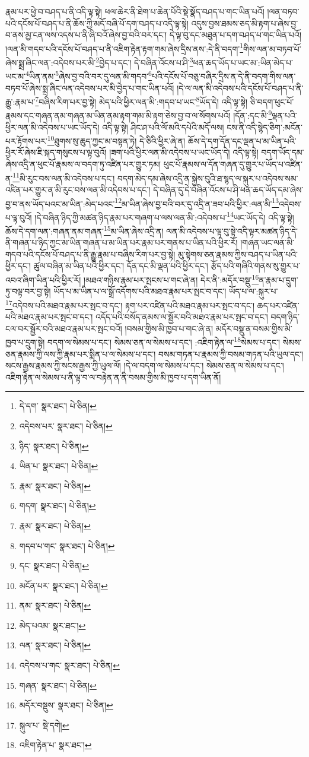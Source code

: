 རྣམ་པར་ཕྱེ་བ་བཤད་པ་ནི་འདི་ལྟ་སྟེ། ཕལ་ཆེར་ནི་ཐེག་པ་ཆེན་པོའི་སྡེ་སྣོད་བཤད་པ་གང་ཡིན་པའོ། །ལན་བཏབ་པའི་དངོས་པོ་བཤད་པ་ནི་ཆོས་ཀྱི་མདོ་བཞི་པོ་དག་བཤད་པ་འདི་ལྟ་སྟེ། འདུས་བྱས་ཐམས་ཅད་མི་རྟག་པ་ཞེས་བྱ་བ་ནས་མྱ་ངན་ལས་འདས་པ་ནི་ཞི་བའོ་ཞེས་བྱ་བའི་བར་དང་། དེ་ལྟ་བུ་དང་མཐུན་པ་དག་བཤད་པ་གང་ཡིན་པའོ། །ལན་མི་གདབ་པའི་དངོས་པོ་བཤད་པ་ནི་འཇིག་རྟེན་རྟག་གམ་ཞེས་དྲིས་ནས་:དེ་ནི་བདག་\footnote{དེ་དག་  སྣར་ཐང་།  པེ་ཅིན། }གིས་ལན་མ་བཏབ་པོ་ཞེས་སྨྲ་ཞིང་ལན་:འདེབས་པར་མི་\footnote{འདེབས་པར་  སྣར་ཐང་།  པེ་ཅིན། }བྱེད་པ་དང་། དེ་བཞིན་འོངས་པ་ཤི་\footnote{ཉིད་  སྣར་ཐང་།  པེ་ཅིན། }ཕན་ཆད་ཡོད་པ་ཡང་མ་:ཡིན་མེད་པ་ཡང་མ་\footnote{ཡིན་པ་  སྣར་ཐང་།  པེ་ཅིན། }ཡིན་ནམ་\footnote{རྣམ་  སྣར་ཐང་།  པེ་ཅིན། }ཞེས་བྱ་བའི་བར་དུ་ལན་མི་གདབ་\footnote{གདག་  སྣར་ཐང་།  པེ་ཅིན། }པའི་དངོས་པོ་བཅུ་བཞིར་དྲིས་ན་དེ་ནི་བདག་གིས་ལན་བཏབ་པོ་ཞེས་སྨྲ་ཞིང་ལན་འདེབས་པར་མི་བྱེད་པ་གང་ཡིན་པའོ། །དེ་ལ་ལན་མི་འདེབས་པའི་དངོས་པོ་བཤད་པ་ནི་རྒྱུ་:རྣམ་པ་\footnote{རྣམ་  སྣར་ཐང་།  པེ་ཅིན། }བཞིས་རིག་པར་བྱ་སྟེ། མེད་པའི་ཕྱིར་ལན་མི་:གདབ་པ་ཡང་\footnote{གདབ་པ་གང་  སྣར་ཐང་།  པེ་ཅིན། }ཡོད་དེ། འདི་ལྟ་སྟེ། ཅི་བདག་ཕུང་པོ་རྣམས་དང་གཞན་ནམ་གཞན་མ་ཡིན་ནམ་རྟག་གམ་མི་རྟག་ཅེས་བྱ་བ་ལ་སོགས་པའོ། །དོན་:དང་མི་\footnote{དང་  སྣར་ཐང་།  པེ་ཅིན། }ལྡན་པའི་ཕྱིར་ལན་མི་འདེབས་པ་ཡང་ཡོད་དེ། འདི་ལྟ་སྟེ། ཤིང་ཤ་པའི་ལོ་མའི་དཔེའི་མདོ་ལས། ངས་ནི་འདི་སྙེད་ཅིག་:མངོན་པར་རྟོགས་པར་\footnote{མངོན་པར་  སྣར་ཐང་།  པེ་ཅིན། }ཐུགས་སུ་ཆུད་ཀྱང་མ་བསྟན་ཏེ། དེ་ཅིའི་ཕྱིར་ཞེ་ན། ཆོས་དེ་དག་དོན་དང་ལྡན་པ་མ་ཡིན་པའི་ཕྱིར་རོ་ཞེས་ཇི་སྐད་གསུངས་པ་ལྟ་བུའོ། །ཟག་པའི་ཕྱིར་ལན་མི་འདེབས་པ་ཡང་ཡོད་དེ། འདི་ལྟ་སྟེ། བདག་ཡོད་དམ་ཞེས་འདྲི་ན་ཕུང་པོ་རྣམས་ལ་བདག་ཏུ་འཛིན་པར་གྱུར་ཏམ། ཕུང་པོ་རྣམས་ལ་དོན་གཞན་དུ་གྱུར་པ་ཡོད་པ་འཛིན་ན་\footnote{ནམ་  སྣར་ཐང་།  པེ་ཅིན། }མི་རུང་བས་ལན་མི་འདེབས་པ་དང་། བདག་མེད་དམ་ཞེས་འདྲི་ན་སྐྱེས་བུའི་ཐ་སྙད་ལ་སྐུར་པ་འདེབས་སམ་འཛིན་པར་གྱུར་ན་མི་རུང་བས་ལན་མི་འདེབས་པ་དང་། དེ་བཞིན་དུ་དེ་བཞིན་འོངས་པ་ཤི་ཕན་ཆད་ཡོད་དམ་ཞེས་བྱ་བ་ནས་ཡོད་པའང་མ་ཡིན་:མེད་པའང་\footnote{མེད་པའམ་  སྣར་ཐང་། }མ་ཡིན་ཞེས་བྱ་བའི་བར་དུ་འདྲི་ན་ཟབ་པའི་ཕྱིར་:ལན་མི་\footnote{ལན་  སྣར་ཐང་།  པེ་ཅིན། }འདེབས་པ་ལྟ་བུའོ། །དེ་བཞིན་ཉིད་ཀྱི་མཚན་ཉིད་རྣམ་པར་གཞག་པ་ལས་ལན་མི་:འདེབས་པ་\footnote{འདེབས་པ་གང་  སྣར་ཐང་།  པེ་ཅིན། }ཡང་ཡོད་དེ། འདི་ལྟ་སྟེ། ཆོས་དེ་དག་ལན་:གཞན་ནམ་གཞན་\footnote{གཞན་  སྣར་ཐང་།  པེ་ཅིན། }མ་ཡིན་ཞེས་འདྲི་ན། ལན་མི་འདེབས་པ་ལྟ་བུ་སྟེ་འདི་ལྟར་མཚན་ཉིད་དེ་ནི་གཞན་པ་ཉིད་ཀྱང་མ་ཡིན་གཞན་པ་མ་ཡིན་པར་རྣམ་པར་གནས་པ་ཡིན་པའི་ཕྱིར་རོ། །གཞན་ཡང་ལན་མི་གདབ་པའི་དངོས་པོ་བཤད་པ་ནི་རྒྱུ་རྣམ་པ་བཞིས་རིག་པར་བྱ་སྟེ། མུ་སྟེགས་ཅན་རྣམས་ཀྱིས་བཤད་པ་ཡིན་པའི་ཕྱིར་དང་། ཚུལ་བཞིན་མ་ཡིན་པའི་ཕྱིར་དང་། དོན་དང་མི་ལྡན་པའི་ཕྱིར་དང་། རྩོད་པའི་གཞིའི་གནས་སུ་གྱུར་པ་འབའ་ཞིག་ཡིན་པའི་ཕྱིར་རོ། །མཐའ་གཉིས་རྣམ་པར་སྤངས་པ་གང་ཞེ་ན། དེར་ནི་:མདོར་བསྡུ་\footnote{མདོར་བསྡུས་  སྣར་ཐང་།  པེ་ཅིན། }ན་རྣམ་པ་དྲུག་ཏུ་བལྟ་བར་བྱ་སྟེ། ཡོད་པ་མ་ཡིན་པ་ལ་སྒྲོ་འདོགས་པའི་མཐའ་རྣམ་པར་སྤང་བ་དང་། ཡོད་པ་ལ་:སྐུར་པ་\footnote{སྐུལ་པ་  སྡེ་དགེ། }འདེབས་པའི་མཐའ་རྣམ་པར་སྤང་བ་དང་། རྟག་པར་འཛིན་པའི་མཐའ་རྣམ་པར་སྤང་བ་དང་། ཆད་པར་འཛིན་པའི་མཐའ་རྣམ་པར་སྤང་བ་དང་། འདོད་པའི་བསོད་ནམས་ལ་སྦྱོར་བའི་མཐའ་རྣམ་པར་སྤང་བ་དང་། བདག་ཉིད་ངལ་བར་སྦྱོར་བའི་མཐའ་རྣམ་པར་སྤང་བའོ། །བསམ་གྱིས་མི་ཁྱབ་པ་གང་ཞེ་ན། མདོར་བསྡུ་ན་བསམ་གྱིས་མི་ཁྱབ་པ་དྲུག་སྟེ། བདག་ལ་སེམས་པ་དང་། སེམས་ཅན་ལ་སེམས་པ་དང་། :འཇིག་རྟེན་ལ་\footnote{འཇིག་རྟེན་པ་  སྣར་ཐང་། }སེམས་པ་དང་། སེམས་ཅན་རྣམས་ཀྱི་ལས་ཀྱི་རྣམ་པར་སྨིན་པ་ལ་སེམས་པ་དང་། བསམ་གཏན་པ་རྣམས་ཀྱི་བསམ་གཏན་པའི་ཡུལ་དང་། སངས་རྒྱས་རྣམས་ཀྱི་སངས་རྒྱས་ཀྱི་ཡུལ་ལོ། །དེ་ལ་བདག་ལ་སེམས་པ་དང་། སེམས་ཅན་ལ་སེམས་པ་དང་། འཇིག་རྟེན་ལ་སེམས་པ་ནི་ལྟ་བ་ལ་བརྟེན་ན་ནི་བསམ་གྱིས་མི་ཁྱབ་པ་དག་ཡིན་ནོ། 